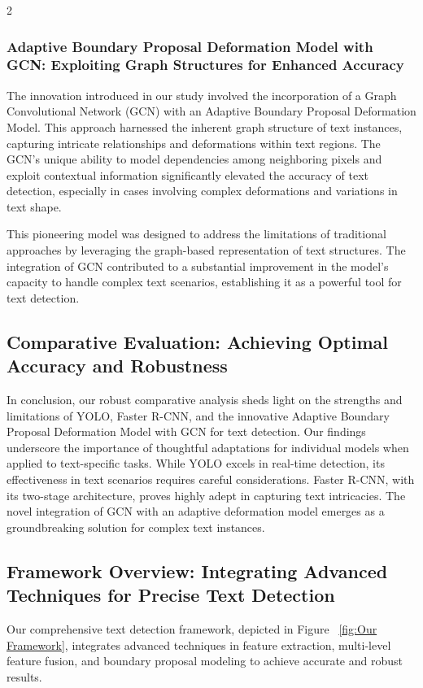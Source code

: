 \documentclass[sn-mathphys,Numbered]{sn-jnl}%
\begin{document}
\begin{multicols}{2}
\subsubsection{Adaptive Boundary Proposal Deformation Model with GCN: Exploiting Graph Structures for Enhanced Accuracy}

The innovation introduced in our study involved the incorporation of a Graph Convolutional Network (GCN) with an Adaptive Boundary Proposal Deformation Model. This approach harnessed the inherent graph structure of text instances, capturing intricate relationships and deformations within text regions. The GCN's unique ability to model dependencies among neighboring pixels and exploit contextual information significantly elevated the accuracy of text detection, especially in cases involving complex deformations and variations in text shape.

This pioneering model was designed to address the limitations of traditional approaches by leveraging the graph-based representation of text structures. The integration of GCN contributed to a substantial improvement in the model's capacity to handle complex text scenarios, establishing it as a powerful tool for text detection.

\subsection{Comparative Evaluation: Achieving Optimal Accuracy and Robustness}
In conclusion, our robust comparative analysis sheds light on the strengths and limitations of YOLO, Faster R-CNN, and the innovative Adaptive Boundary Proposal Deformation Model with GCN for text detection. Our findings underscore the importance of thoughtful adaptations for individual models when applied to text-specific tasks. While YOLO excels in real-time detection, its effectiveness in text scenarios requires careful considerations. Faster R-CNN, with its two-stage architecture, proves highly adept in capturing text intricacies. The novel integration of GCN with an adaptive deformation model emerges as a groundbreaking solution for complex text instances.

\subsection{Framework Overview: Integrating Advanced Techniques for Precise Text Detection}

Our comprehensive text detection framework, depicted in Figure ~\ref{fig:Our Framework}, integrates advanced techniques in feature extraction, multi-level feature fusion, and boundary proposal modeling to achieve accurate and robust results.


\end{multicols}
\end{document}
